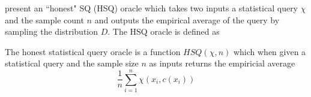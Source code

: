 \cite{yang_learning_2001} present an ``honest" SQ (HSQ) oracle which takes two inputs a statistical query $\chi$ and the sample count $n$ and outputs the empirical average of the query by sampling the distribution $D$. The HSQ oracle is defined as

\begin{definition}
The honest statistical query oracle is a function $HSQ(\chi, n)$ which when given a statistical query and the sample size $n$ as inputs returns the empiricial average
\begin{equation*}
    \frac{1}{n} \sum_{i=1}^n \chi(x_i, c(x_i))
\end{equation*}
\end{definition}
